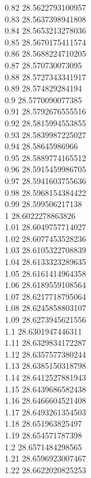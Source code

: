 {0.82	28.5622793100957\\
0.83	28.5637398941808\\
0.84	28.5653213278036\\
0.85	28.5670175411574\\
0.86	28.5688224710205\\
0.87	28.570730073095\\
0.88	28.5727343341917\\
0.89	28.574829284194\\
0.9	28.5770090077385\\
0.91	28.5792676555516\\
0.92	28.5815994553855\\
0.93	28.5839987225027\\
0.94	28.58645986966\\
0.95	28.5889774165512\\
0.96	28.5915459986705\\
0.97	28.5941603755636\\
0.98	28.5968154384422\\
0.99	28.599506217138\\
1	28.6022278863826\\
1.01	28.6049757714027\\
1.02	28.6077453528236\\
1.03	28.6105322708839\\
1.04	28.6133323289635\\
1.05	28.6161414964358\\
1.06	28.6189559108564\\
1.07	28.6217718795064\\
1.08	28.6245858803107\\
1.09	28.6273945621556\\
1.1	28.6301947446311\\
1.11	28.6329834172287\\
1.12	28.6357577380244\\
1.13	28.6385150318798\\
1.14	28.6412527881943\\
1.15	28.6439686582438\\
1.16	28.6466604521408\\
1.17	28.6493261354503\\
1.18	28.651963825497\\
1.19	28.654571787398\\
1.2	28.6571484298565\\
1.21	28.6596923007467\\
1.22	28.6622020825253\\
}
